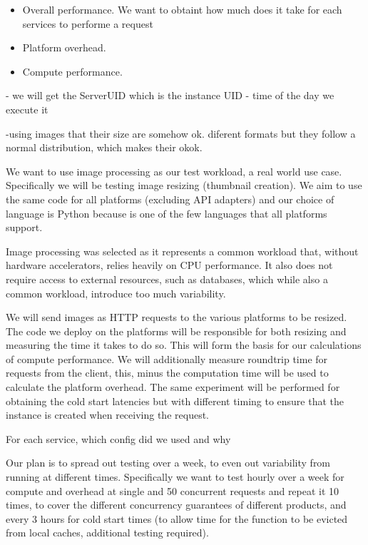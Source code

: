 \documentclass[11pt]{article}
\begin{document}
\begin{itemize}
\item Overall performance. We want to obtaint how much does it take for each services to performe a request   
\item Platform overhead.
\item Compute performance.
\end{itemize}


- we will get the ServerUID which is the instance UID
- time of the day we execute it



-using images that their size are somehow ok. diferent formats but they follow a normal distribution, which makes their okok. 

We want to use image processing as our test workload, a real world \cite{ii} use case. Specifically we will be testing image resizing (thumbnail creation). We aim to use the same code for all platforms (excluding API adapters) and our choice of language is Python because is one of the few languages that all platforms support. 

Image processing was selected as it represents a common workload that, without hardware accelerators, relies heavily on CPU performance. It also does not require access to external resources, such as databases, which while also a common workload, introduce too much variability.

We will send images as HTTP requests to the various platforms to be resized. The code we deploy on the platforms will be responsible for both resizing and measuring the time it takes to do so. This will form the basis for our calculations of compute performance. We will additionally measure roundtrip time for requests from the client, this, minus the computation time will be used to calculate the platform overhead.  The same experiment will be performed for obtaining the cold start latencies but with different timing to ensure that the instance is created when receiving the request.








For each service, which config did we used and why 








Our plan is to spread out testing over a week, to even out variability from running at different times. Specifically we want to test hourly over a week for compute and overhead at single and 50 concurrent requests and repeat it 10 times, to cover the different concurrency guarantees of different products, and every 3 hours for cold start times (to allow time for the function to be evicted from local caches, additional testing required).
\end{document}
